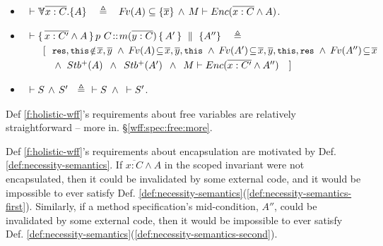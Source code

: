 {\begin{definition}
\begin{itemize}
\item
  $\strut \  \vdash {\TwoStatesN {\overline {x:C}} {A}} \ \ \ \triangleq\  \ \ \fv(A)\subseteq\{  \overline x \}\,\wedge\, {M \vdash \encaps {{\overline {x: C}} \wedge A}} $.
    \item
 $\strut \ \vdash {\mprepostN{\overline{x:C'} \wedge A}{p\ C}{m}{y}{C}{A'} {A''}}\ \ \ \triangleq$\\
$\strut \hspace{0.7cm}  [ \ \ {\small{   {\prg{res},\prg{this}\!\notin\! \overline{x}, \overline{y}}\ \wedge\  {\fv(A)\!\subseteq\! \overline x, \overline y, \prg{this}}\     \wedge\    \fv(A')\!\subseteq \! \overline{x}, \overline{y}, \prg{this}, \prg{res}\   \wedge\   \fv(A'')\!\subseteq\!  {\overline{x}} }} $\\
    $\strut \hspace{0.7cm} \ \ \  \wedge\  {Stb^+( A  )} \, \ \wedge \ \,  {Stb^+( A' )} \, \ \wedge \  \,  M \vdash {\ensuremath Enc( \overline {x: C'} \wedge A'' )}\ \ \  ]$ 
  \item  $\strut \   \vdash S\, \wedge \, S' \ \ \triangleq \ \  \vdash S\, \ \wedge\,  \ \vdash S'  $.  
\end{itemize}

\end{definition}

Def \ref{f:holistic-wff}'s  requirements about  free variables are relatively straightforward -- more  in. \S \ref{wff:spec:free:more}.

Def \ref{f:holistic-wff}'s  requirements about encapsulation are motivated by  Def.   \ref{def:necessity-semantics}. If  $\overline {x:C}\wedge A$ in the scoped invariant  were not encapsulated,  then it could be invalidated by some external code, and it would be impossible to ever satisfy Def.   \ref{def:necessity-semantics}(\ref{def:necessity-semantics-first}). %
Similarly, if a method specification's mid-condition, $A''$, could be invalidated by some external code, then it would be impossible to ever satisfy Def.   \ref{def:necessity-semantics}(\ref{def:necessity-semantics-second}). %


}
